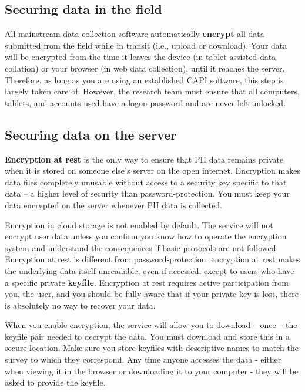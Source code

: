 \subsection{Securing data in the field}
All mainstream data collection software automatically \textbf{encrypt}
all data submitted from the field while in transit (i.e., upload or download).  Your data will be encrypted from the time it leaves the device (in tablet-assisted data collation) or your browser (in web data collection), until it reaches the server. Therefore, as long as you are using an established CAPI software, this step is largely taken care of. However, the research team must ensure that all computers, tablets, and accounts used have a logon password and are never left unlocked. 

\subsection{Securing data on the server}
\textbf{Encryption at rest} is the only way to ensure that PII data remains private when it is stored on someone else's server on the open internet.
Encryption makes data files completely unusable without access to a security key specific to that data --
a higher level of security than password-protection. You must keep your data encrypted on the server whenever PII data is collected. 

Encryption in cloud storage is not enabled by default. The service will not encrypt user data unless you confirm you know how to operate the encryption system and understand the consequences if basic protocols are not followed.
Encryption at rest is different from password-protection: encryption at rest makes the underlying data itself unreadable, even if accessed, except to users who have a specific private \textbf{keyfile}. Encryption at rest requires active participation from you, the user, and you should be fully aware that if your private key is lost, there is absolutely no way to recover your data.

When you enable encryption, the service will allow you to download -- once -- the keyfile pair needed to decrypt the data.
You must download and store this in a secure location. Make sure you store keyfiles with descriptive names to match the survey to which they correspond.
Any time anyone accesses the data - either when viewing it in the browser or downloading it to your computer - they will be asked to provide the keyfile. 


